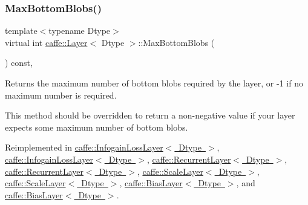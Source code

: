 \mbox{\label{classcaffe_1_1_layer_af8bdc989053e0363ab032026b46de7c3}} 
\subsubsection{\texorpdfstring{Max\+Bottom\+Blobs()}{MaxBottomBlobs()}\hspace{0.1cm}{\footnotesize\ttfamily [2/2]}}
{\footnotesize\ttfamily template$<$typename Dtype$>$ \\
virtual int \mbox{\hyperlink{classcaffe_1_1_layer}{caffe\+::\+Layer}}$<$ Dtype $>$\+::Max\+Bottom\+Blobs (\begin{DoxyParamCaption}{ }\end{DoxyParamCaption}) const\hspace{0.3cm}{\ttfamily [inline]}, {\ttfamily [virtual]}}



Returns the maximum number of bottom blobs required by the layer, or -\/1 if no maximum number is required. 

This method should be overridden to return a non-\/negative value if your layer expects some maximum number of bottom blobs. 

Reimplemented in \mbox{\hyperlink{classcaffe_1_1_infogain_loss_layer_a9b2372959a16da1e80ae7a98b7689a4c}{caffe\+::\+Infogain\+Loss\+Layer$<$ Dtype $>$}}, \mbox{\hyperlink{classcaffe_1_1_infogain_loss_layer_a9b2372959a16da1e80ae7a98b7689a4c}{caffe\+::\+Infogain\+Loss\+Layer$<$ Dtype $>$}}, \mbox{\hyperlink{classcaffe_1_1_recurrent_layer_a983e1ead91884f9d2049a3000254961c}{caffe\+::\+Recurrent\+Layer$<$ Dtype $>$}}, \mbox{\hyperlink{classcaffe_1_1_recurrent_layer_a983e1ead91884f9d2049a3000254961c}{caffe\+::\+Recurrent\+Layer$<$ Dtype $>$}}, \mbox{\hyperlink{classcaffe_1_1_scale_layer_a7867d035776f78fe486ce633ec0520ad}{caffe\+::\+Scale\+Layer$<$ Dtype $>$}}, \mbox{\hyperlink{classcaffe_1_1_scale_layer_a7867d035776f78fe486ce633ec0520ad}{caffe\+::\+Scale\+Layer$<$ Dtype $>$}}, \mbox{\hyperlink{classcaffe_1_1_bias_layer_abdb89e3bc940f999d1d4da83de90a97c}{caffe\+::\+Bias\+Layer$<$ Dtype $>$}}, and \mbox{\hyperlink{classcaffe_1_1_bias_layer_abdb89e3bc940f999d1d4da83de90a97c}{caffe\+::\+Bias\+Layer$<$ Dtype $>$}}.

